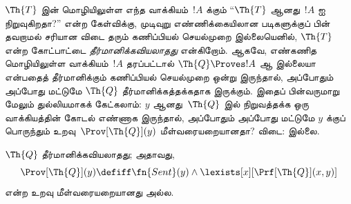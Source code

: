 \documentclass[../../../include/open-logic-section]{subfiles}
\begin{document}


$\Th{T}$ இன் மொழியிலுள்ள எந்த வாக்கியம்~$!A$ க்கும்
“$\Th{T}$ ஆனது~$!A$ ஐ நிறுவுகிறதா?” என்ற கேள்விக்கு, முடிவுறு
எண்ணிக்கையிலான படிகளுக்குப் பின் தவறாமல் சரியான விடை தரும் கணிப்பியல்
செயல்முறை இல்லையெனில், $\Th{T}$ என்ற கோட்பாட்டை
\emph{தீர்மானிக்கவியலாதது} என்கிறோம். ஆகவே, எண்கணித மொழியிலுள்ள
வாக்கியம்~$!A$ தரப்பட்டால் $\Th{Q} \Proves !A$ ஆ இல்லையா என்பதைத்
தீர்மானிக்கும் கணிப்பியல் செயல்முறை ஒன்று இருந்தால், அப்போதும் அப்போது
மட்டுமே $\Th{Q}$ தீர்மானிக்கத்தக்கதாக இருக்கும். இதைப் பின்வருமாறு மேலும்
துல்லியமாகக் கேட்கலாம்: $y$ ஆனது~$\Th{Q}$ இல் நிறுவத்தக்க ஒரு
வாக்கியத்தின் கோடல் எண்ணாக இருந்தால், அப்போதும் அப்போது மட்டுமே
$y$ க்குப் பொருந்தும் உறவு~$\Prov[\Th{Q}](y)$ மீள்வரையறையானதா?
விடை: இல்லை.

\begin{thm}
$\Th{Q}$ தீர்மானிக்கவியலாதது; அதாவது,
\[
\Prov[\Th{Q}](y) \defiff \fn{Sent}(y) \land
\lexists[x][\Prf[\Th{Q}](x, y)]
\]
என்ற உறவு மீள்வரையறையானது அல்ல.
\end{thm}
\end{document}
